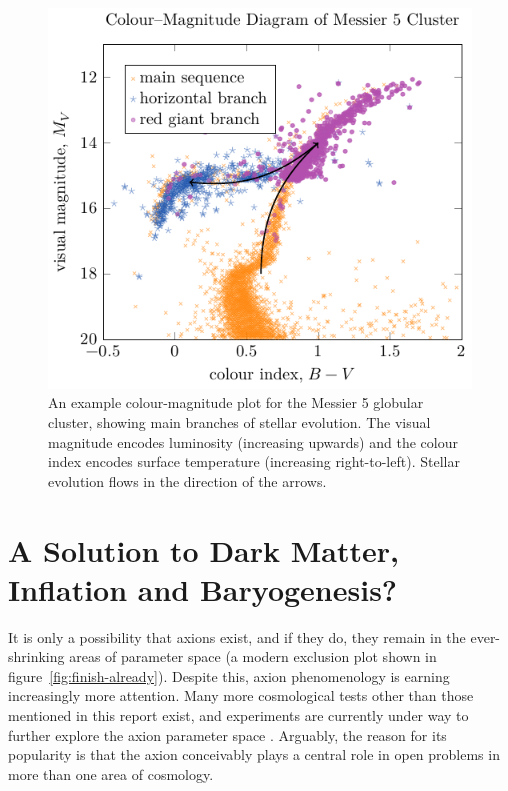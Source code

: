 \begin{figure}
	\centering
	\includegraphics{diagrams/globular-cluster.pdf}
	\caption{An example colour-magnitude plot for the Messier 5 globular cluster, showing main branches of stellar evolution.
	The visual magnitude encodes luminosity (increasing upwards) and the colour index encodes surface temperature (increasing right-to-left).
	Stellar evolution flows in the direction of the arrows.
	}
	\label{fig:globular-cluster}
\end{figure}






\section{A Solution to Dark Matter, Inflation and Baryogenesis?}

It is only a possibility that axions exist, and if they do, they remain in the ever-shrinking areas of parameter space (a modern exclusion plot shown in figure~\ref{fig:finish-already}).
Despite this, axion phenomenology is earning increasingly more attention.
Many more cosmological tests other than those mentioned in this report exist, and experiments are currently under way to further explore the axion parameter space \cite{Irastorza_2018,landscape_2020,further-lab-experiments_2017}.
Arguably, the reason for its popularity is that the axion conceivably plays a central role in open problems in more than one area of cosmology.


